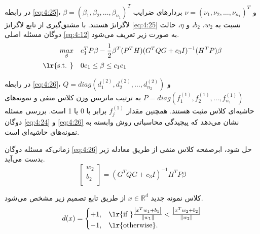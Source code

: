 در رابطه \ref{eq:4:25}،  $\beta=(\beta_{1}, \beta_{2}, \dots,\beta_{n_{1}})^{T}$ و $\nu=(\nu_{1}, \nu_{2}, \dots,\nu_{n_{1}})^{T}$ بردارهای ضرایب لاگرانژ هستند. با مشتق‌گیری از تابع لاگرانژ \ref{eq:4:25} نسبت به  $w_{2}$،  $b_{2}$، و  $\eta$، حالت دوگان مسئله اصلی \ref{eq:4:12} به صورت زیر تعریف می‌شود.
\begin{equation}\label{eq:4:26}
\begin{split}
\mathop{{max}}\limits_{\beta} \quad & e_{1}^{T}P\beta-\frac{1}{2}{{\beta}^{T}}(P^{T}H){(G^{T}QG+c_{3}I)^{-1}}{({H}^{T}P)}\beta   \\
\textrm{\lr{s.t. }} \quad & 0{{e}_{1}}\le \beta \le {c_{1}}{{e}_{1}}
\end{split}
\end{equation}

در رابطه \ref{eq:4:26}،  $Q=diag(d^{(2)}_{1},d^{(2)}_{2},\dots,d^{(2)}_{n_{2}})$ و  $P=diag(f^{(1)}_{1},f^{(1)}_{2},\dots,f^{(1)}_{n_{1}})$ به ترتیب ماتریس وزن کلاس منفی و نمونه‌های حاشیه‌ای کلاس مثبت هستند. همچنین مقدار  $f^{(1)}_{j}$ برابر با 0 یا 1 است. بررسی مسئله دوگان \ref{eq:4:24} و \ref{eq:4:26} نشان می‌دهد که پیچیدگی محاسباتی روش  وابسته به نمونه‌های حاشیه‌ای است.

زمانی‌که مسئله دوگان \ref{eq:4:26} حل شود، ابرصفحه کلاس منفی از طریق معادله زیر بدست می‌آید.
\begin{equation} \label{eq:4:27}
\left[ \begin{matrix}
{{w}_{2}}  \\
{{b}_{2}}  \\
\end{matrix} \right] = (G^{T}QG+c_{3}I)^{-1}H^{T}P\beta
\end{equation}

کلاس نمونه جدید $x \in \mathbb{R}^{d}$ از طریق تابع تصمیم زیر مشخص می‌شود.
\begin{equation}\label{eq:4:28}
d(x) =
\begin{cases}
+1, & \textrm{\lr{if }} \frac{\left| {{x}^{T}}{{w}_{1}}+{{b}_{1}} \right|}{\left\|w_1\right\|} < \frac{\left| {{x}^{T}}{{w}_{2}}+{{b}_{2}} \right|}{\left\|w_2\right\|} \\
-1, & \textrm{\lr{otherwise}}.
\end{cases}
\end{equation}
 
